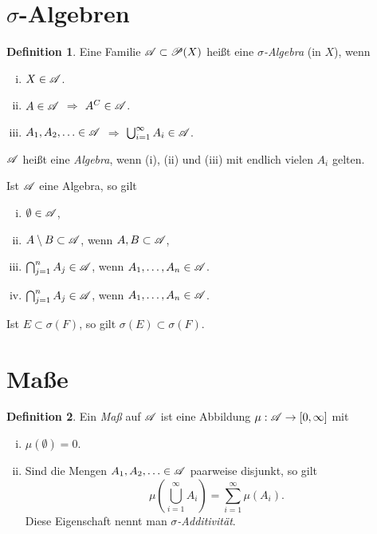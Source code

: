 \documentclass[
 a4paper,
 10pt,
 parskip=half
 ]{scrartcl}
\theoremstyle{plain}
\theoremstyle{definition}
\newtheorem*{defn}{Definition}
\numberwithin{equation}{section}
\begin{document}
\section*{\texorpdfstring{$\sigma$}{Sigma}-Algebren}
\begin{defn}
 Eine Familie $\mathscr{A} \subset \mathscr{P}(X)$ heißt eine \emph{$\sigma$-Algebra} (in $X$),
 wenn
 \begin{enumerate}[(i)]
  \item $X \in \mathscr{A}$.
  \item $A \in \mathscr{A}$ $\Rightarrow$ $A^C \in \mathscr{A}$.
  \item $A_1, A_2, \ldots \in \mathscr{A}$ $\Rightarrow$ $\bigcup_{i=1}^\infty A_i \in \mathscr{A}$.
 \end{enumerate}
 $\mathscr{A}$ heißt eine \emph{Algebra}, wenn (i), (ii) und (iii) mit endlich vielen
 $A_i$ gelten.
\end{defn}

\begin{lem}
 Ist $\mathscr{A}$ eine Algebra, so gilt
 \begin{enumerate}[(i)]
  \item $\emptyset \in \mathscr{A}$,
  \item $A \setminus B \subset \mathscr{A}$, wenn $A,B \subset \mathscr{A}$,
  \item $\bigcap_{j=1}^n A_j \in \mathscr{A}$, wenn $A_1, \ldots, A_n \in \mathscr{A}$.
  \item $\bigcap_{j=1}^n A_j \in \mathscr{A}$, wenn $A_1, \ldots, A_n \in \mathscr{A}$.
 \end{enumerate}
\end{lem}

\begin{lem}
 Ist $E \subset \sigma(F)$, so gilt $\sigma(E) \subset \sigma(F)$.
\end{lem}

\section*{Maße}
\begin{defn}
 Ein \emph{Maß} auf $\mathscr{A}$ ist eine Abbildung $\mu: \mathscr{A} \to [0,\infty]$ mit
 \begin{enumerate}[(i)]
  \item $\mu( \emptyset ) = 0$.
  \item Sind die Mengen $A_1, A_2, \ldots \in \mathscr{A}$ paarweise disjunkt, so gilt
  \[ \mu\left( \bigcup_{i=1}^\infty A_i \right) = \sum_{i=1}^\infty \mu(A_i). \]
  Diese Eigenschaft nennt man \emph{$\sigma$-Additivität}.
 \end{enumerate}
\end{defn}
\end{document}
